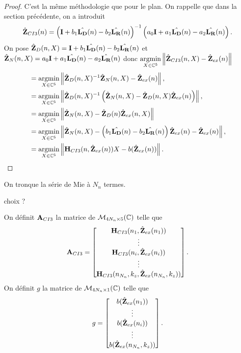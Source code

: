    \begin{proof}
      C'est la même méthodologie que pour le plan.
      On rappelle que dans la section précédente, on a introduit
      \begin{equation*}
        \hat{\mathbf{Z}}_{CI3}(n) = \left(\mathbf{I} + b_1 \hat{\mathbf{L_D}}(n) - b_2 \hat{\mathbf{L_R}}(n) \right)^{-1}\left(a_0 \mathbf{I} + a_1 {\hat{\mathbf{L_D}}(n)} - a_2 {\hat{\mathbf{L_R}}(n)}\right).
      \end{equation*}
      On pose \(\hat{\mathbf{Z}}_D(n,X) = \mathbf{I} + b_1 \hat{\mathbf{L_D}}(n) - b_2 \hat{\mathbf{L_R}}(n)\) et \(\hat{\mathbf{Z}}_N(n,X) = a_0 \mathbf{I} + a_1 {\hat{\mathbf{L_D}}(n)} - a_2 {\hat{\mathbf{L_R}}(n)}\) donc \({\underset{X\in\mathbb C^5}{\operatorname{argmin}}} \left\lVert\hat{\mathbf{Z}}_{CI3}(n,X) - \hat{\mathbf{Z}}_{ex}(n)\right\rVert\)
      \begin{align*}
      & = {\underset{X\in\mathbb C^5}{\operatorname{argmin}}} \left\lVert\hat{\mathbf{Z}}_D(n,X)^{-1}\hat{\mathbf{Z}}_N(n,X) - \hat{\mathbf{Z}}_{ex}(n) \right\rVert,
      \\
      &= {\underset{X\in\mathbb C^5}{\operatorname{argmin}}} \left\lVert\hat{\mathbf{Z}}_D(n,X)^{-1}\left(\hat{\mathbf{Z}}_N(n,X) - \hat{\mathbf{Z}}_D(n,X)\hat{\mathbf{Z}}_{ex}(n)\right) \right\rVert,
      \\
      &= {\underset{X\in\mathbb C^5}{\operatorname{argmin}}} \left\lVert\hat{\mathbf{Z}}_N(n,X) - \hat{\mathbf{Z}}_D(n)\hat{\mathbf{Z}}_{ex}(n,X)\right\rVert
      \\
      &= {\underset{X\in\mathbb C^5}{\operatorname{argmin}}} \left\lVert\hat{\mathbf{Z}}_N(n,X) - \left(b_1 \hat{\mathbf{L_D}}(n) - b_2 \hat{\mathbf{L_R}}(n)\right)\hat{\mathbf{Z}}_{ex}(n) - \hat{\mathbf{Z}}_{ex}(n) \right\rVert,
      \\
      &= {\underset{X\in\mathbb C^5}{\operatorname{argmin}}} \left\lVert\mathbf{H}_{CI3}(n,\hat{\mathbf{Z}}_{ex}(n))X - b(\hat{\mathbf{Z}}_{ex}(n))\right\rVert.
      \end{align*}
    \end{proof}

    On tronque la série de Mie à \(N_{n}\) termes.
\begin{REM}
  choix ?
\end{REM} 
    \begin{defn}
      On définit \(\mathbf{A}_{CI3}\) la matrice de \(\mathcal{M}_{4N_{n}\times5}(\mathbb C)\) telle que
      \begin{equation*}
        \mathbf{A}_{CI3} = 
        \begin{bmatrix}
          \mathbf{H}_{CI3}(n_1,\hat{\mathbf{Z}}_{ex}(n_1))
          \\
          \vdots
          \\
          \mathbf{H}_{CI3}(n_i,\hat{\mathbf{Z}}_{ex}(n_i))
          \\
          \vdots
          \\
          \mathbf{H}_{CI3}(n_{N_n},k_{z},\hat{\mathbf{Z}}_{ex}(n_{N_n},k_{z}))
        \end{bmatrix}.
      \end{equation*}
      On définit \(g\) la matrice de \(\mathcal{M}_{4N_{n}\times1}(\mathbb C)\) telle que
      \begin{equation*}
        g = 
        \begin{bmatrix}
          b(\hat{\mathbf{Z}}_{ex}(n_1))
          \\
          \vdots
          \\
          b(\hat{\mathbf{Z}}_{ex}(n_i))
          \\
          \vdots
          \\
          b(\hat{\mathbf{Z}}_{ex}(n_{N_n},k_{z}))
        \end{bmatrix}.
      \end{equation*}
    \end{defn}

